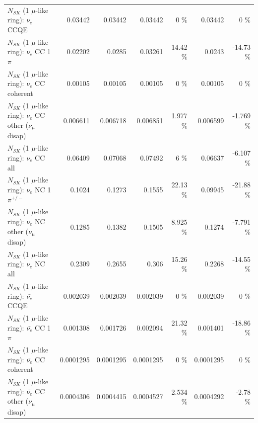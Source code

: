 \begin{table}
\begin{tabular}{| l | r | r | r  r | r  r |}
\hline
\hline
\hline
                                      $N_{SK}$ (1 $\mu$-like ring): $\nu_e$ CCQE &         0.03442 &         0.03442 &         0.03442 &        0 \%  &         0.03442 &        0 \%  \\ 
                                 $N_{SK}$ (1 $\mu$-like ring): $\nu_e$ CC 1$\pi$ &         0.02202 &          0.0285 &         0.03261 &    14.42 \%  &          0.0243 &   -14.73 \%  \\ 
                               $N_{SK}$ (1 $\mu$-like ring): $\nu_e$ CC coherent &         0.00105 &         0.00105 &         0.00105 &        0 \%  &         0.00105 &        0 \%  \\ 
                $N_{SK}$ (1 $\mu$-like ring): $\nu_e$ CC other ($\nu_\mu$ disap) &        0.006611 &        0.006718 &        0.006851 &    1.977 \%  &        0.006599 &   -1.769 \%  \\ 
                                  $N_{SK}$ (1 $\mu$-like ring): $\nu_{e}$ CC all &         0.06409 &         0.07068 &         0.07492 &        6 \%  &         0.06637 &   -6.107 \%  \\ 
\hline
                           $N_{SK}$ (1 $\mu$-like ring): $\nu_e$ NC 1$\pi^{+/-}$ &          0.1024 &          0.1273 &          0.1555 &    22.13 \%  &         0.09945 &   -21.88 \%  \\ 
                $N_{SK}$ (1 $\mu$-like ring): $\nu_e$ NC other ($\nu_\mu$ disap) &          0.1285 &          0.1382 &          0.1505 &    8.925 \%  &          0.1274 &   -7.791 \%  \\ 
                                  $N_{SK}$ (1 $\mu$-like ring): $\nu_{e}$ NC all &          0.2309 &          0.2655 &           0.306 &    15.26 \%  &          0.2268 &   -14.55 \%  \\ 
\hline
\hline
\hline
                                $N_{SK}$ (1 $\mu$-like ring): $\bar{\nu_e}$ CCQE &        0.002039 &        0.002039 &        0.002039 &        0 \%  &        0.002039 &        0 \%  \\ 
                           $N_{SK}$ (1 $\mu$-like ring): $\bar{\nu_e}$ CC 1$\pi$ &        0.001308 &        0.001726 &        0.002094 &    21.32 \%  &        0.001401 &   -18.86 \%  \\ 
                         $N_{SK}$ (1 $\mu$-like ring): $\bar{\nu_e}$ CC coherent &       0.0001295 &       0.0001295 &       0.0001295 &        0 \%  &       0.0001295 &        0 \%  \\ 
          $N_{SK}$ (1 $\mu$-like ring): $\bar{\nu_e}$ CC other ($\nu_\mu$ disap) &       0.0004306 &       0.0004415 &       0.0004527 &    2.534 \%  &       0.0004292 &    -2.78 \%  \\ 

\end{tabular}
\end{table}

